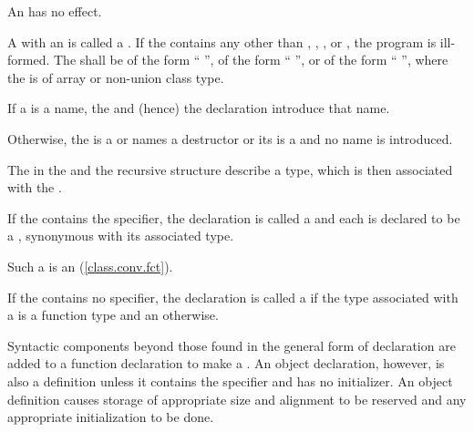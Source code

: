 \pnum
An  has no effect.

\pnum
A  with an  is called
a .
If the  contains
any  other than
, , , or
,
the program is ill-formed.
The  shall be
of the form ``\tcode{=} '',
of the form ``\tcode{\{}  \tcode{\}}'',
or
of the form ``\tcode{(}  \tcode{)}'',
where the
 is of array or non-union class type.

\pnum
If a  is a name, the
 and (hence) the declaration introduce that name.
\begin{note}
Otherwise, the  is
a  or
names a destructor or
its  is a  and
no name is introduced.
\end{note}
The  in
the  and
the recursive  structure
describe a type,
which is then associated with the .

\pnum
If the  contains the 
specifier, the declaration is called a 
and each 
is declared to be a , synonymous with its
associated type.
\begin{note}
Such a  is an 
(\ref{class.conv.fct}).
\end{note}
If the
 contains no  specifier, the
declaration is called a  if
the type associated with a  is a function type and
an  otherwise.

\pnum
{}%
Syntactic components beyond those found in the general form of
declaration are added to a function declaration to make a
. An object declaration, however, is also
a definition unless it contains the  specifier and has no
initializer.
%
An object definition causes storage of appropriate size and alignment to be reserved and
any appropriate initialization to be done.

